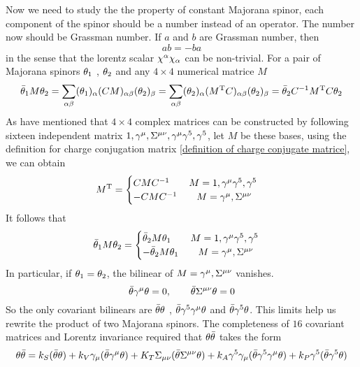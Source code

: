 Now we need to study the the property of constant Majorana spinor, each component of the spinor should be a number instead of an operator. The number now should be Grassman number. If $a$ and $b$ are Grassman number, then
\begin{equation}
   ab = -ba 
\end{equation}
in the sense that the lorentz scalar $\chi^{\alpha}\chi_{\alpha}$ can be non-trivial. For a pair of Majorana spinors $\theta_1$ , $\theta_2$ and any $4\times4$ numerical matrice $M$ 
\begin{equation}
\bar{\theta}_1 M \theta_2 
= \sum_{\alpha\beta} (\theta_{1})_{\alpha} (CM)_{\alpha\beta}(\theta_2)_{\beta}
= \sum_{\alpha\beta} (\theta_2)_{\alpha} (M^{\text{T}}C)_{\alpha\beta}(\theta_2)_{\beta}
= \bar{\theta}_2 C^{-1} M^{\text{T}} C \theta_2
\end{equation}
As have mentioned that $4\times4$ complex matrices can be constructed by following sixteen independent matrix $1,\gamma^{\mu},\Sigma^{\mu\nu},\gamma^{\mu}\gamma^5,\gamma^5$, let $M$ be these bases, using the definition for charge conjugation matrix \eqref{definition of charge conjugate matrice}, we can obtain
\begin{equation}\label{property of charge conjugation matrix C}
  M^{\text{T}} = 
  \begin{cases}
     C M C^{-1}   \qquad  M = 1, \gamma^{\mu}\gamma^5, \gamma^5 \\
     -C M C^{-1}   \qquad M = \gamma^{\mu}, \Sigma^{\mu\nu} 
\end{cases}
\end{equation}
It follows that 
\begin{equation}
\bar{\theta}_1 M \theta_2 =
  \begin{cases}
    \bar{\theta}_2 M \theta_1   \qquad  M = 1, \gamma^{\mu}\gamma^5, \gamma^5 \\
    -\bar{\theta}_2 M \theta_1    \qquad M = \gamma^{\mu}, \Sigma^{\mu\nu}
  \end{cases}
\end{equation}
In particular, if $\theta_1 = \theta_2$,  the bilinear of $M = \gamma^{\mu}, \Sigma^{\mu\nu}$ vanishes.
\begin{equation}\label{the constraint on bilinear of covariant matrices}
 \bar{\theta}\gamma^{\mu}\theta = 0,\qquad \bar{\theta}\Sigma^{\mu\nu}\theta = 0
\end{equation} 
So the only covariant bilinears are $\bar{\theta}\theta$ , $\bar{\theta}\gamma^{5}\gamma^{\mu}\theta$ and $\bar{\theta}\gamma^{5}\theta$. This limits help us rewrite the product of two Majorana spinors. The completeness of $16$ covariant matrices and  Lorentz invariance required that $\theta\bar{\theta}$ takes the form 
\begin{equation}
\theta\bar{\theta}=
k_S(\bar{\theta}\theta)+
k_V\gamma_{\mu}(\bar{\theta}\gamma^{\mu}\theta)+
K_T\Sigma_{\mu\nu}(\bar{\theta}\Sigma^{\mu\nu}\theta)+
k_A\gamma^5\gamma_{\mu}(\bar{\theta}\gamma^5\gamma^{\mu}\theta)+
k_P\gamma^5(\bar{\theta}\gamma^{5}\theta)
\end{equation}
